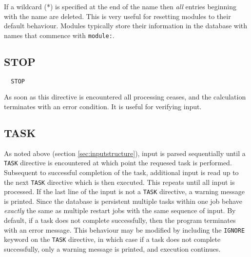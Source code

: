 If a wildcard (*) is specified at the end of the name then {\em all}
entries beginning with the name are deleted.  This is very useful for
resetting modules to their default behaviour.  Modules typically store
their information in the database with names that commence with
\verb+module:+.

\subsection{STOP}

\begin{verbatim}
  STOP
\end{verbatim}

As soon as this directive is encountered all processing ceases, and
the calculation terminates with an error condition.  It is useful for
verifying input.

\subsection{TASK}
\label{sec:task}

As noted above (section \ref{sec:inputstructure}), input is parsed
sequentially until a \verb+TASK+ directive is encountered at which
point the requesed task is performed.  Subsequent to successful
completion of the task, additional input is read up to the next
\verb+TASK+ directive which is then executed.  This repeats until all
input is processed.  If the last line of the input is not a
\verb+TASK+ directive, a warning message is printed.  Since the
database is persistent multiple tasks within one job behave {\em
  exactly} the same as multiple restart jobs with the same sequence of
input.  By default, if a task does not complete successfully, then
the program terminates with an error message.  This behaviour may
be modified by including the \verb+IGNORE+ keyword on the \verb+TASK+
directive, in which case if a task does not complete successfully, 
only a warning message is printed, and execution continues.

